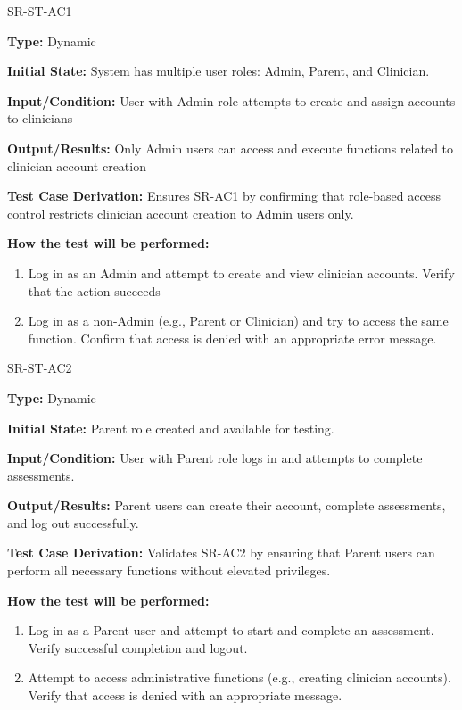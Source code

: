 \documentclass[12pt, titlepage]{article}
\begin{document}
\begin{itemize}
  \begin{item}
      SR-ST-AC1
      \begin{mdframed}[linewidth=0.5mm]
          \textbf{Type:} Dynamic \par
          \textbf{Initial State:} System has multiple user roles: Admin, Parent, and Clinician. \par
          \textbf{Input/Condition:}   User with Admin role attempts to create and assign accounts to clinicians \par
          \textbf{Output/Results:}  Only Admin users can access and execute functions related 
          to clinician account creation \par
          \textbf{Test Case Derivation:} Ensures SR-AC1 by confirming that role-based access control restricts clinician account creation to Admin users only. \par
          \textbf{How the test will be performed:}
          \begin{enumerate}[noitemsep]
            \item Log in as an Admin and attempt to create and view clinician accounts. Verify that the action succeeds
            \item Log in as a non-Admin (e.g., Parent or Clinician) and try to access the same 
            function. Confirm that access is denied with an appropriate error message.
          \end{enumerate}
      \end{mdframed}
  \end{item}

  \begin{item}
    SR-ST-AC2
    \begin{mdframed}[linewidth=0.5mm]
      \textbf{Type:} Dynamic \par
      \textbf{Initial State:} Parent role created and available for testing. \par
      \textbf{Input/Condition:} User with Parent role logs in and attempts to complete assessments. \par
      \textbf{Output/Results:} Parent users can create their account, complete assessments, and log out successfully. \par
      \textbf{Test Case Derivation:} Validates SR-AC2 by ensuring that Parent users can perform all necessary functions without elevated privileges. \par
      \textbf{How the test will be performed:}
      \begin{enumerate}[noitemsep]
        \item Log in as a Parent user and attempt to start and complete an assessment. Verify successful completion and logout.
        \item Attempt to access administrative functions (e.g., creating clinician accounts). 
        Verify that access is denied with an appropriate message.
      \end{enumerate}
    \end{mdframed}
  \end{item}
  

\end{itemize}
\end{document}

